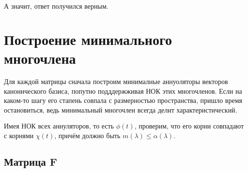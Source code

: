 \documentclass[12pt, a4paper]{article}
\begin{document}
    А значит, ответ получился верным.

    \section{Построение минимального многочлена}

    Для каждой матрицы сначала построим минималные аннуоляторы
    векторов канонического базиса, попутно подддержживая НОК этих многочленов. 
    Если на каком-то шагу его стапень совпала с размерностью пространства, пришло время остановиться, 
    ведь минимальный многочлен всегда делит характеристический.

    Имея НОК всех аннуляторов, то есть $\phi(t)$, проверим, что его корни совпадают с корнями $\chi(t)$,
    причём должно быть $m(\lambda) \leqslant \alpha(\lambda)$.

    \subsection{Матрица F}

    
\end{document}
